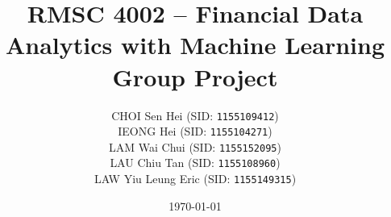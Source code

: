 \documentclass[11pt,a4paper]{article}
\begin{document}
\title{\textsc{RMSC 4002} -- Financial Data Analytics with Machine Learning \\ Group Project}
\author{
    CHOI Sen Hei (SID: \texttt{1155109412}) \\
    IEONG Hei (SID: \texttt{1155104271}) \\
    LAM Wai Chui (SID: \texttt{1155152095}) \\
    LAU Chiu Tan (SID: \texttt{1155108960}) \\
    LAW Yiu Leung Eric (SID: \texttt{1155149315})
}
\date{\today}
\maketitle
\end{document}
